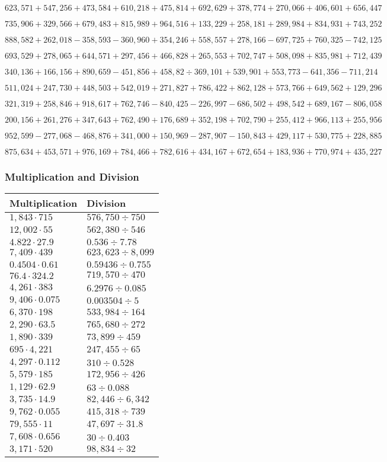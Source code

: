 \(623,571+547,256+473,584+610,218+475,814+692,629+378,774+270,066+406,601+ 656,447\)

\(735,906+329,566+679,483+815,989+964,516+133,229+258,181+289,984+834,931+743,252\)

\(888,582+262,018-358,593-360,960+354,246+558,557+278,166-697,725+760,325-742,125\)

\(693,529+278,065+644,571+297,456+466,828+265,553+702,747+508,098+835,981+712,439\)

\(340,136+166,156+890,659-451,856+458,82÷369,101+539,901+553,773-641,356-711,214\)

\(511,024+247,730+448,503+542,019+271,827+786,422+862,128+573,766+649,562+129,296\)

\(321,319+258,846+918,617+762,746-840,425-226,997-686,502+498,542+689,167-806,058\)

\(200,156+261,276+347,643+762,490+176,689+352,198+702,790+255,412+966,113+255,956\)

\(952,599-277,068-468,876+341,000+150,969-287,907-150,843+429,117+530,775+228,885\)

\(875,634+453,571+976,169+784,466+782,616+434,167+672,654+183,936+770,974+435,227\)

\hypertarget{multiplication-and-division-337}{%
\subsubsection{Multiplication and
Division}\label{multiplication-and-division-337}}

\begin{longtable}[]{@{}ll@{}}
\toprule
Multiplication & Division\tabularnewline
\midrule
\endhead
\(1,843\cdot715\) & \(576,750 ÷750\)\tabularnewline
\(12,002\cdot55\) & \(562,380÷546\)\tabularnewline
\(4.822\cdot27.9\) & \(0.536÷7.78\)\tabularnewline
\(7,409\cdot439\) & \(623,623÷8,099\)\tabularnewline
\(0.4504\cdot0.61\) & \(0.59436÷0.755\)\tabularnewline
\(76.4\cdot324.2\) & \(719,570÷470\)\tabularnewline
\(4,261\cdot383\) & \(6.2976÷0.085\)\tabularnewline
\(9,406\cdot0.075\) & \(0.003504÷5\)\tabularnewline
\(6,370\cdot198\) & \(533,984÷164\)\tabularnewline
\(2,290\cdot63.5\) & \(765,680÷272\)\tabularnewline
\(1,890\cdot339\) & \(73,899÷459\)\tabularnewline
\(695\cdot4,221\) & \(247,455÷65\)\tabularnewline
\(4,297\cdot0.112\) & \(310÷0.528\)\tabularnewline
\(5,579\cdot185\) & \(172,956÷426\)\tabularnewline
\(1,129\cdot62.9\) & \(63÷0.088\)\tabularnewline
\(3,735\cdot14.9\) & \(82,446÷6,342\)\tabularnewline
\(9,762\cdot0.055\) & \(415,318÷739\)\tabularnewline
\(79,555\cdot11\) & \(47,697÷31.8\)\tabularnewline
\(7,608\cdot0.656\) & \(30÷0.403\)\tabularnewline
\(3,171\cdot520\) & \(98,834÷32\)\tabularnewline
\bottomrule
\end{longtable}

